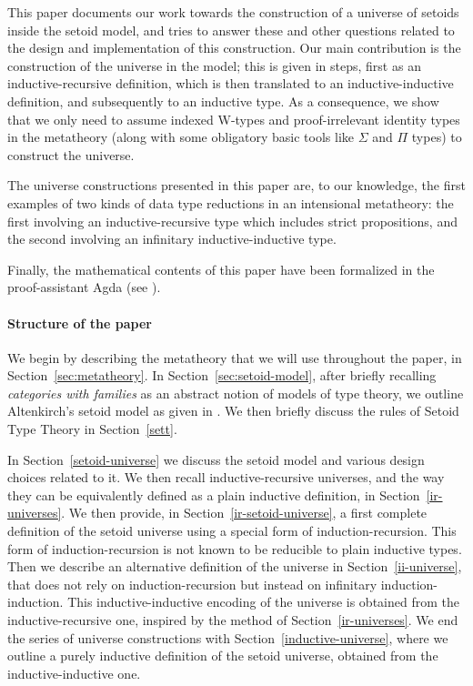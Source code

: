 \documentclass[autoref]{llncs}
\begin{document}
This paper documents our work towards the construction of a universe of setoids
inside the setoid model, and tries to answer these and other questions related
to the design and implementation of this construction. Our main contribution is
the construction of the universe in the model; this is given in steps, first as
an inductive-recursive definition, which is then translated to an
inductive-inductive definition, and subsequently to an inductive type. As a
consequence, we show that we only need to assume indexed W-types and
proof-irrelevant identity types in the metatheory (along with some obligatory
basic tools like $\Sigma$ and $\Pi$ types) to construct the universe.

The universe constructions presented in this paper are, to our knowledge, the
first examples of two kinds of data type reductions in an intensional
metatheory: the first involving an inductive-recursive type which includes
strict propositions, and the second involving an infinitary inductive-inductive
type.

Finally, the mathematical contents of this paper have been formalized in the
proof-assistant Agda (see \cite{agda-code}).

\paragraph*{Structure of the paper}

We begin by describing the metatheory that we will use throughout the paper, in
Section~\ref{sec:metatheory}. In Section~\ref{sec:setoid-model}, after briefly
recalling \emph{categories with families} as an abstract notion of models of
type theory, we outline Altenkirch's setoid model as given in \cite{mpc19}. We
then briefly discuss the rules of Setoid Type Theory in Section~\ref{sett}.

In Section~\ref{setoid-universe} we discuss the setoid model and various design
choices related to it. We then recall inductive-recursive universes, and the way
they can be equivalently defined as a plain inductive definition, in
Section~\ref{ir-universes}.
%
We then provide, in Section~\ref{ir-setoid-universe}, a first complete
definition of the setoid universe using a special form of induction-recursion.
This form of induction-recursion is not known to be reducible to plain inductive types.
Then we describe an alternative definition of the universe in
Section~\ref{ii-universe}, that does not rely on induction-recursion but instead
on infinitary induction-induction. This inductive-inductive encoding of the
universe is obtained from the inductive-recursive one, inspired by the method of
Section~\ref{ir-universes}.
%
We end the series of universe constructions with
Section~\ref{inductive-universe}, where we outline a purely inductive definition
of the setoid universe, obtained from the inductive-inductive one.
\end{document}
